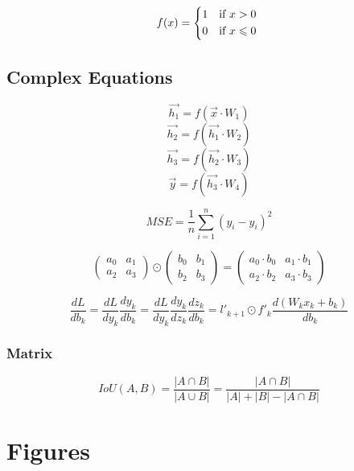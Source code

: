 \documentclass{article} %
\begin{document}
\begin{equation}
    f(x) =
    \begin{cases*}
        1 & if $x > 0$\\
        0 & if $x \leqslant 0$
     \end{cases*}
\end{equation}

\subsection{Complex Equations}

\begin{equation}\label{eq:layers}
    \vec{h_1} = f(\vec{x} \cdot W_1)
\end{equation}
\[
    \vec{h_2} = f(\vec{h_1} \cdot W_2)
\]
\[
    \vec{h_3} = f(\vec{h_2} \cdot W_3)
\]
\[
    \vec{y} = f(\vec{h_3} \cdot W_4)
\]

\begin{equation}\label{eq:mse}
    MSE = \frac{1}{n} \sum_{i=1}^{n}(y_{i} - \hat{y}_{i})^2
\end{equation}

\[
\begin{pmatrix} a_0 & a_1\\ a_2 & a_3 \end{pmatrix}
\odot
\begin{pmatrix} b_0 & b_1\\ b_2 & b_3 \end{pmatrix}
=
\begin{pmatrix} a_0 \cdot b_0 & a_1 \cdot b_1\\ a_2 \cdot b_2 & a_3 \cdot b_3 \end{pmatrix}
\]

\[
\frac{dL}{db_k} = \frac{dL}{dy_k} \frac{dy_k}{db_k} = \frac{dL}{dy_k} \frac{dy_k}{dz_k} \frac{dz_k}{db_k} = l'_{k+1} \odot f'_k \frac{d(W_k x_k + b_k)}{db_k}
\]

\subsubsection{Matrix}

\begin{equation}
    IoU(A,B) = \frac{|A \cap B|}{|A \cup B|} = \frac{|A \cap B|}{|A| + |B| - |A \cap B|}
\end{equation}

\cleardoublepage

\section{Figures}
\end{document}

